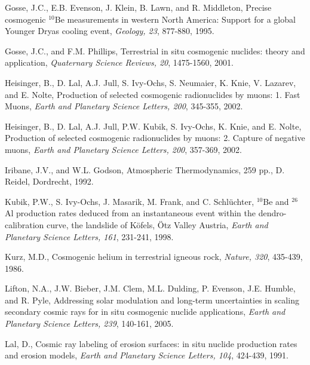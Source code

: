\documentclass{article}
\begin{document}
\begin{description}
\item Gosse, J.C., E.B. Evenson,  J. Klein, B. Lawn, and R. Middleton,
  Precise  cosmogenic  $^{10}$Be  measurements  in western  North  America:
  Support for a global Younger Dryas cooling event, {\it Geology, 23},
  877-880, 1995.

\item Gosse,  J.C., and F.M. Phillips, Terrestrial  in situ cosmogenic
  nuclides: theory  and application, {\it  Quaternary Science Reviews,
    20}, 1475-1560, 2001.
  
\item Heisinger, B.,  D. Lal, A.J. Jull, S. Ivy-Ochs,  S. Neumaier, K. 
  Knie, V.  Lazarev, and  E.  Nolte, Production of selected cosmogenic
  radionuclides  by muons:  1. Fast  Muons, {\it  Earth  and Planetary
    Science Letters, 200}, 345-355, 2002.
  
\item Heisinger, B., D. Lal, A.J.   Jull, P.W. Kubik, S.  Ivy-Ochs, K. 
  Knie, and E. Nolte,  Production of selected cosmogenic radionuclides
  by muons:  2. Capture  of negative muons,  {\it Earth  and Planetary
    Science Letters, 200}, 357-369, 2002.
  
\item Iribane, J.V., and  W.L. Godson, Atmospheric Thermodynamics, 259
  pp., D. Reidel, Dordrecht, 1992.
  
\item  Kubik, P.W.,  S.   Ivy-Ochs, J.   Masarik,  M.  Frank,  and C.  
  Schl\"{u}chter,  $^{10}$Be  and $^{26}$Al  production  rates  deduced from  an
  instantaneous  event   within  the  dendro-calibration   curve,  the
  landslide  of K\"{o}fels,  \"{O}tz  Valley Austria,  {\it Earth  and
    Planetary Science Letters, 161}, 231-241, 1998.

\item Kurz, M.D., Cosmogenic  helium in terrestrial igneous rock, {\it
    Nature, 320}, 435-439, 1986.
  
\item Lifton, N.A., J.W. Bieber,  J.M. Clem, M.L. Dulding, P. Evenson,
  J.E. Humble, and R.  Pyle, Addressing solar modulation and long-term
  uncertainties  in   scaling  secondary  cosmic  rays   for  in  situ
  cosmogenic  nuclide applications, {\it  Earth and  Planetary Science
    Letters, 239}, 140-161, 2005.

\item  Lal, D.,  Cosmic  ray  labeling of  erosion  surfaces: in  situ
  nuclide  production  rates  and   erosion  models,  {\it  Earth  and
    Planetary Science Letters, 104}, 424-439, 1991.
  

\end{description}
\end{document}
